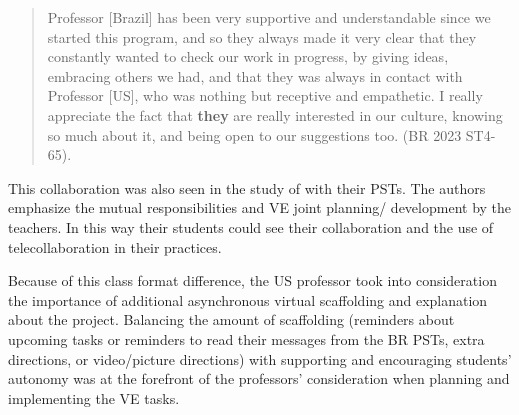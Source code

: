\begin{quote}
Professor [Brazil] has been very supportive and understandable
since we started this program, and so they always made it very clear
that they constantly wanted to check our work in progress, by giving
ideas, embracing others we had, and that they was always in contact with
Professor [US], who was nothing but receptive and empathetic. I
really appreciate the fact that \textbf{they} are really interested in
our culture, knowing so much about it, and being open to our suggestions
too. (BR 2023 ST4-65).
\end{quote}

This collaboration was also seen in the study of \textcite[p. 412]{sadler2016twelve} with their PSTs. The authors emphasize the mutual
responsibilities and VE joint planning/ development by the teachers. In
this way their students could see their collaboration and the use of
telecollaboration in their practices.

Because of this class format difference, the US professor took into
consideration the importance of additional asynchronous virtual
scaffolding and explanation about the project. Balancing the amount of
scaffolding (reminders about upcoming tasks or reminders to read their
messages from the BR PSTs, extra directions, or video/picture
directions) with supporting and encouraging students’
autonomy was at the forefront of the professors’
consideration when planning and implementing the VE tasks.





